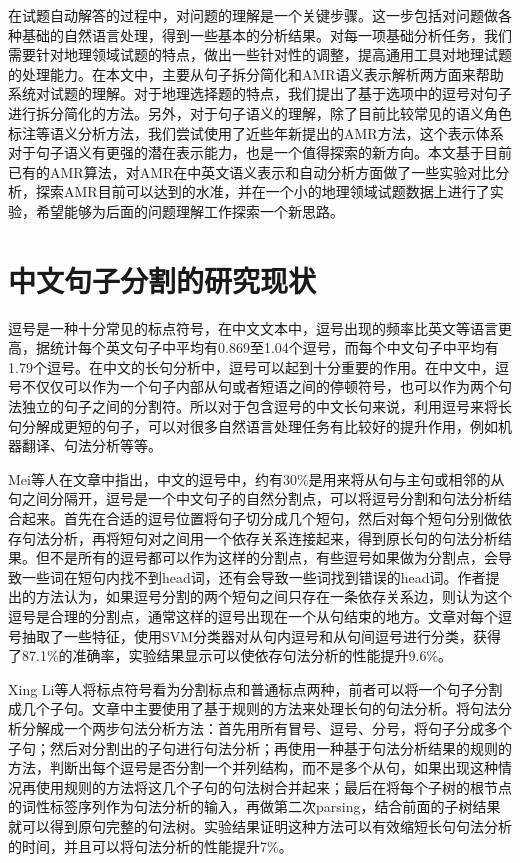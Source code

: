 \documentclass[master, winfont]{njuthesis}
\begin{document}
在试题自动解答的过程中，对问题的理解是一个关键步骤。这一步包括对问题做各种基础的自然语言处理，得到一些基本的分析结果。对每一项基础分析任务，我们需要针对地理领域试题的特点，做出一些针对性的调整，提高通用工具对地理试题的处理能力。在本文中，主要从句子拆分简化和AMR语义表示解析两方面来帮助系统对试题的理解。对于地理选择题的特点，我们提出了基于选项中的逗号对句子进行拆分简化的方法。另外，对于句子语义的理解，除了目前比较常见的语义角色标注等语义分析方法，我们尝试使用了近些年新提出的AMR方法，这个表示体系对于句子语义有更强的潜在表示能力，也是一个值得探索的新方向。本文基于目前已有的AMR算法，对AMR在中英文语义表示和自动分析方面做了一些实验对比分析，探索AMR目前可以达到的水准，并在一个小的地理领域试题数据上进行了实验，希望能够为后面的问题理解工作探索一个新思路。

\section{中文句子分割的研究现状}
\label{section:imtnow}
逗号是一种十分常见的标点符号，在中文文本中，逗号出现的频率比英文等语言更高，据统计每个英文句子中平均有0.869至1.04个逗号，而每个中文句子中平均有1.79个逗号\cite{Jin2004}。在中文的长句分析中，逗号可以起到十分重要的作用。在中文中，逗号不仅仅可以作为一个句子内部从句或者短语之间的停顿符号\cite{Li2004}，也可以作为两个句法独立的句子之间的分割符\cite{Xu2013}\cite{Xue2011}。所以对于包含逗号的中文长句来说，利用逗号来将长句分解成更短的句子，可以对很多自然语言处理任务有比较好的提升作用，例如机器翻译\cite{Wang2014}、句法分析\cite{Jin2004}\cite{Mao2007}\cite{Kong2014}\cite{Li2004}\cite{Li2008}等等。

Mei等人\cite{Jin2004}在文章中指出，中文的逗号中，约有30\%是用来将从句与主句或相邻的从句之间分隔开，逗号是一个中文句子的自然分割点，可以将逗号分割和句法分析结合起来。首先在合适的逗号位置将句子切分成几个短句，然后对每个短句分别做依存句法分析，再将短句对之间用一个依存关系连接起来，得到原长句的句法分析结果。但不是所有的逗号都可以作为这样的分割点，有些逗号如果做为分割点，会导致一些词在短句内找不到head词，还有会导致一些词找到错误的head词。作者提出的方法认为，如果逗号分割的两个短句之间只存在一条依存关系边，则认为这个逗号是合理的分割点，通常这样的逗号出现在一个从句结束的地方。文章对每个逗号抽取了一些特征，使用SVM分类器对从句内逗号和从句间逗号进行分类，获得了87.1\%的准确率，实验结果显示可以使依存句法分析的性能提升9.6\%。

Xing Li等人\cite{Li2004}将标点符号看为分割标点和普通标点两种，前者可以将一个句子分割成几个子句。文章中主要使用了基于规则的方法来处理长句的句法分析。将句法分析分解成一个两步句法分析方法：首先用所有冒号、逗号、分号，将句子分成多个子句；然后对分割出的子句进行句法分析；再使用一种基于句法分析结果的规则的方法，判断出每个逗号是否分割一个并列结构，而不是多个从句，如果出现这种情况再使用规则的方法将这几个子句的句法树合并起来；最后在将每个子树的根节点的词性标签序列作为句法分析的输入，再做第二次parsing，结合前面的子树结果就可以得到原句完整的句法树。实验结果证明这种方法可以有效缩短长句句法分析的时间，并且可以将句法分析的性能提升7\%。
\end{document}
